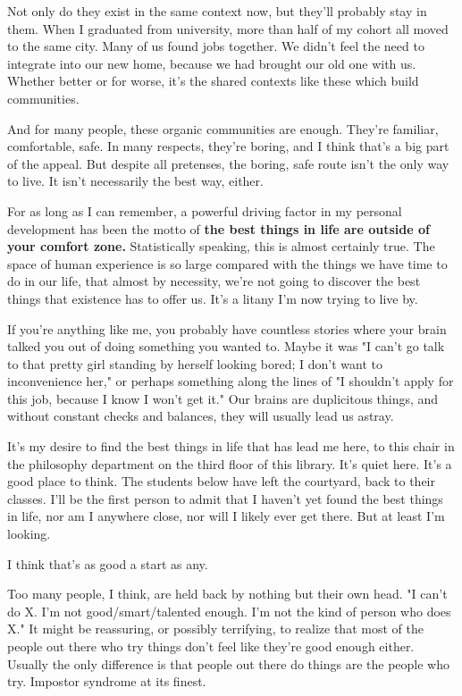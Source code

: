 \documentclass[]{book}
\begin{document}
Not only do they exist in the same context now, but they'll probably stay in
them. When I graduated from university, more than half of my cohort all moved to
the same city. Many of us found jobs together. We didn't feel the need to
integrate into our new home, because we had brought our old one with us. Whether
better or for worse, it's the shared contexts like these which build
communities.

And for many people, these organic communities are enough. They're familiar,
comfortable, safe. In many respects, they're boring, and I think that's a big
part of the appeal. But despite all pretenses, the boring, safe route isn't the
only way to live. It isn't necessarily the best way, either.

For as long as I can remember, a powerful driving factor in my personal
development has been the motto of \textbf{the best things in life are outside of
your comfort zone.} Statistically speaking, this is almost certainly true. The
space of human experience is so large compared with the things we have time to
do in our life, that almost by necessity, we're not going to discover the best
things that existence has to offer us. It's a litany I'm now trying to live by.

If you're anything like me, you probably have countless stories where your brain
talked you out of doing something you wanted to. Maybe it was "I can't go talk
to that pretty girl standing by herself looking bored; I don't want to
inconvenience her," or perhaps something along the lines of "I shouldn't apply
for this job, because I know I won't get it." Our brains are duplicitous things,
and without constant checks and balances, they will usually lead us astray.

It's my desire to find the best things in life that has lead me here, to this
chair in the philosophy department on the third floor of this library. It's
quiet here. It's a good place to think. The students below have left the
courtyard, back to their classes. I'll be the first person to admit that I
haven't yet found the best things in life, nor am I anywhere close, nor will I
likely ever get there. But at least I'm looking.

I think that's as good a start as any.

Too many people, I think, are held back by nothing but their own head. "I can't
do X. I'm not good/smart/talented enough. I'm not the kind of person who does
X." It might be reassuring, or possibly terrifying, to realize that most of the
people out there who try things don't feel like they're good enough either.
Usually the only difference is that people out there do things are the people
who try. Impostor syndrome at its finest.
\end{document}
